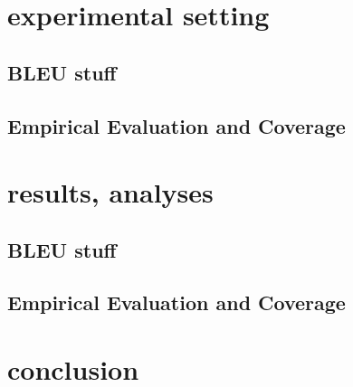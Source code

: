 \documentclass[11pt]{article}
\begin{document}
\section{experimental setting}

\subsection{BLEU stuff}

\subsection{Empirical Evaluation and Coverage}
\label{eval}

\section{results, analyses}

\subsection{BLEU stuff}

\subsection{Empirical Evaluation and Coverage}

\section{conclusion}

\end{document}
